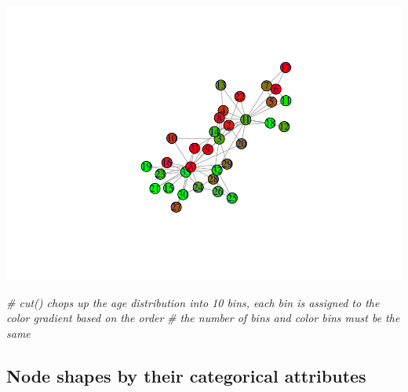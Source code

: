 \documentclass[
]{book}
\newenvironment{Shaded}{\begin{snugshade}}{\end{snugshade}}
\newcommand{\AttributeTok}[1]{\textcolor[rgb]{0.13,0.29,0.53}{#1}}
\newcommand{\CommentTok}[1]{\textcolor[rgb]{0.56,0.35,0.01}{\textit{#1}}}
\newcommand{\FunctionTok}[1]{\textcolor[rgb]{0.13,0.29,0.53}{\textbf{#1}}}
\newcommand{\NormalTok}[1]{#1}
\newcommand{\SpecialCharTok}[1]{\textcolor[rgb]{0.81,0.36,0.00}{\textbf{#1}}}
\newcommand{\StringTok}[1]{\textcolor[rgb]{0.31,0.60,0.02}{#1}}
\begin{document}
\includegraphics{bookdown-demo_files/figure-latex/unnamed-chunk-127-2.pdf}

\begin{Shaded}
\begin{Highlighting}[]
\CommentTok{\# cut() chops up the age distribution into 10 bins, each bin is assigned to the color gradient based on the order }
\CommentTok{\# the number of bins and color bins must be the same }
\end{Highlighting}
\end{Shaded}

\subsection{Node shapes by their categorical attributes}\label{node-shapes-by-their-categorical-attributes}

\begin{Shaded}
\end{Shaded}
\end{document}
